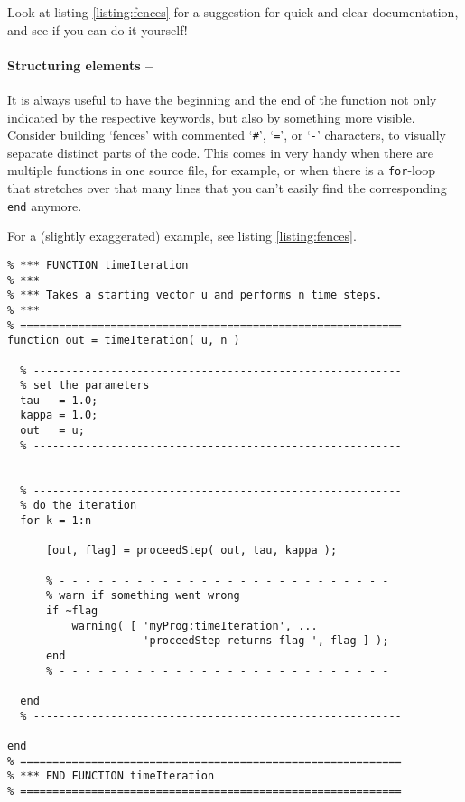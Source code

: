 Look at listing \ref{listing:fences} for a suggestion for quick and clear documentation, and see if you can do it yourself!


\paragraph{Structuring elements -- \cleansymbol\cleansymbol\cleansymbol}
It is always useful to have the beginning and the end of the function not only indicated by the respective keywords, but also by something more visible. Consider building `fences' with commented `\lstinline!#!', `\lstinline!=!', or `\lstinline!-!' characters, to visually separate distinct parts of the code. This comes in very handy when there are multiple functions in one source file, for example, or when there is a \lstinline!for!-loop that stretches over that many lines that you can't easily find the corresponding \lstinline!end! anymore.

For a (slightly exaggerated) example, see listing \ref{listing:fences}.

\begin{lstlisting}[float,label={listing:fences},caption={Function in which \lstinline!-!-fences are used to emphasize the functionally separate sections of the code.}]
% ===========================================================
% *** FUNCTION timeIteration
% ***
% *** Takes a starting vector u and performs n time steps.
% ***
% ===========================================================
function out = timeIteration( u, n )

  % ---------------------------------------------------------
  % set the parameters
  tau   = 1.0;
  kappa = 1.0;
  out   = u;
  % ---------------------------------------------------------


  % ---------------------------------------------------------
  % do the iteration
  for k = 1:n

      [out, flag] = proceedStep( out, tau, kappa );

      % - - - - - - - - - - - - - - - - - - - - - - - - - -
      % warn if something went wrong
      if ~flag
          warning( [ 'myProg:timeIteration', ...
                     'proceedStep returns flag ', flag ] );
      end
      % - - - - - - - - - - - - - - - - - - - - - - - - - -

  end
  % ---------------------------------------------------------

end
% ===========================================================
% *** END FUNCTION timeIteration
% ===========================================================
\end{lstlisting}


